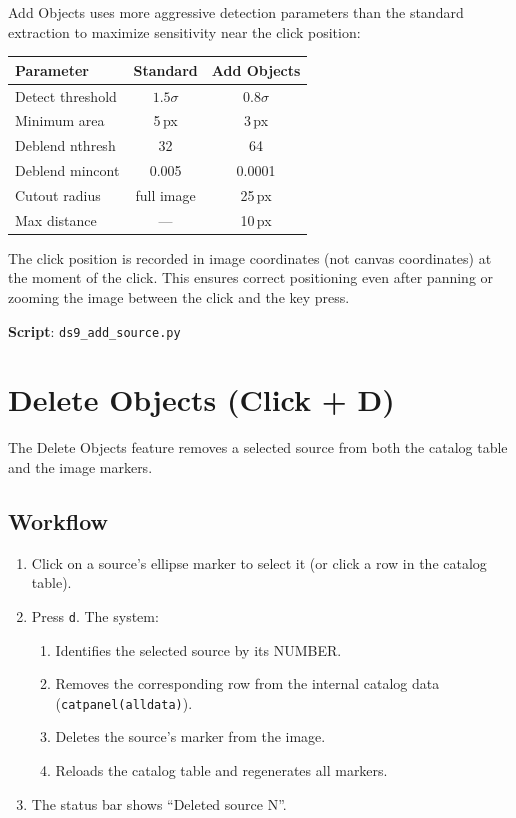 \documentclass[11pt,fleqn]{book}
\begin{document}
Add Objects uses more aggressive detection parameters than the standard extraction to maximize sensitivity near the click position:

\begin{center}
\begin{tabular}{lcc}
\toprule
\textbf{Parameter} & \textbf{Standard} & \textbf{Add Objects} \\
\midrule
Detect threshold & $1.5\sigma$ & $0.8\sigma$ \\
Minimum area & 5\,px & 3\,px \\
Deblend nthresh & 32 & 64 \\
Deblend mincont & 0.005 & 0.0001 \\
Cutout radius & full image & 25\,px \\
Max distance & --- & 10\,px \\
\bottomrule
\end{tabular}
\end{center}

\begin{remark}
The click position is recorded in image coordinates (not canvas coordinates) at the moment of the click. This ensures correct positioning even after panning or zooming the image between the click and the key press.
\end{remark}

\textbf{Script}: \texttt{ds9\_add\_source.py}


\section{Delete Objects (Click + D)}

The Delete Objects feature removes a selected source from both the catalog table and the image markers.

\subsection{Workflow}

\begin{enumerate}[leftmargin=2em]
  \item Click on a source's ellipse marker to select it (or click a row in the catalog table).
  \item Press \texttt{d}. The system:
  \begin{enumerate}
    \item Identifies the selected source by its NUMBER.
    \item Removes the corresponding row from the internal catalog data (\texttt{catpanel(alldata)}).
    \item Deletes the source's marker from the image.
    \item Reloads the catalog table and regenerates all markers.
  \end{enumerate}
  \item The status bar shows ``Deleted source N''.
\end{enumerate}
\end{document}
